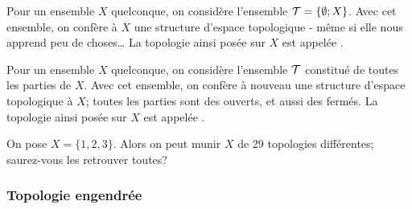 \begin{example}\label{DefTopologieGrossiere}
  Pour un ensemble \( X \) quelconque, on considère l'ensemble \( \mathcal{T} = \{ \emptyset; X\} \). Avec cet ensemble, on confère à \(X \) une structure d'espace topologique - même si elle nous apprend peu de choses\dots{} La topologie ainsi posée sur \(X \) est appelée .
\end{example}

\begin{example}\label{DefTopologieDiscrete}
  Pour un ensemble \( X \) quelconque, on considère l'ensemble \( \mathcal{T} \) constitué de toutes les parties de \( X \). Avec cet ensemble, on confère à nouveau une structure d'espace topologique à \(X \); toutes les parties sont des ouverts, et aussi des fermés. La topologie ainsi posée sur \(X \) est appelée .
\end{example}

\begin{example} 
    On pose \( X = \{1, 2, 3\} \). Alors on peut munir \( X \) de 29 topologies différentes\cite{BIBooSLBZooRYtdIi}; saurez-vous les retrouver toutes?
\end{example}

\subsubsection{Topologie engendrée}

